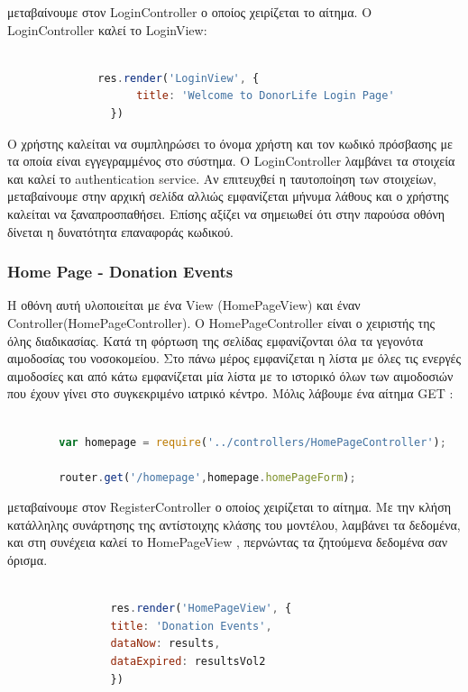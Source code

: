 μεταβαίνουμε στον LoginController ο οποίος χειρίζεται το αίτημα. Ο LoginController καλεί το LoginView:



		\begin{lstlisting}[language=Javascript]			
		
              res.render('LoginView', {
                    title: 'Welcome to DonorLife Login Page'
                })


		\end{lstlisting}

		Ο χρήστης καλείται να συμπληρώσει το όνομα χρήστη και τον κωδικό πρόσβασης με τα οποία είναι εγγεγραμμένος στο σύστημα. Ο LoginController λαμβάνει  τα στοιχεία και καλεί το authentication service. Αν επιτευχθεί  η  ταυτοποίηση των στοιχείων, μεταβαίνουμε στην αρχική σελίδα αλλιώς εμφανίζεται μήνυμα λάθους και ο χρήστης καλείται να ξαναπροσπαθήσει. Επίσης αξίζει να σημειωθεί ότι στην παρούσα οθόνη δίνεται η δυνατότητα επαναφοράς κωδικού.
		
		
				\subsubsection{Home Page - Donation Events}
		
	Η οθόνη αυτή υλοποιείται με ένα View (HomePageView) και έναν Controller(HomePageController).  O HomePageController είναι ο χειριστής της όλης διαδικασίας. Κατά τη φόρτωση της σελίδας εμφανίζονται όλα τα γεγονότα αιμοδοσίας του νοσοκομείου. Στο πάνω μέρος εμφανίζεται η λίστα με όλες τις ενεργές αιμοδοσίες και από κάτω εμφανίζεται μία λίστα με το ιστορικό όλων των αιμοδοσιών που έχουν γίνει στο συγκεκριμένο ιατρικό κέντρο. Μόλις λάβουμε ένα αίτημα GET :
		
		\begin{lstlisting}[language=Javascript]			
		
		var homepage = require('../controllers/HomePageController');
		
		router.get('/homepage',homepage.homePageForm);  


		\end{lstlisting}
		
μεταβαίνουμε στον RegisterController ο οποίος χειρίζεται το αίτημα. Με την κλήση κατάλληλης συνάρτησης της αντίστοιχης κλάσης του μοντέλου, λαμβάνει τα δεδομένα,  και στη συνέχεια καλεί το HomePageView , περνώντας τα ζητούμενα δεδομένα σαν όρισμα.



		\begin{lstlisting}[language=Javascript]			
		
	            res.render('HomePageView', { 
                title: 'Donation Events',
                dataNow: results,
                dataExpired: resultsVol2
                })

		\end{lstlisting}
		
